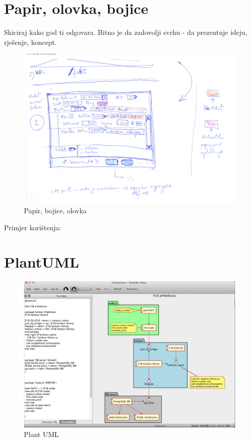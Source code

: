 \documentclass[times, utf8, seminar]{fit}
\begin{document}
\section{Papir, olovka, bojice}

Skiciraj kako god ti odgovara. Bitno je da zadovolji svrhu - da prezentuje ideju, rješenje, koncept.

\begin{figure}[H]
\centering
\includegraphics[width=14cm]{img/papir_i_olovka.png}
\caption{Papir, bojice, olovka}
\end{figure}

Primjer korištenja: \href{https://github.com/knowhow/F18_knowhow/wiki/F18-web-fakt}{\color{blue}{web FAKT UI prototip}}

\section{PlantUML}

\begin{figure}[H]
\centering
\includegraphics[width=14cm]{img/plantuml_f18.png}
\caption{Plant UML}
\end{figure}
\end{document}
